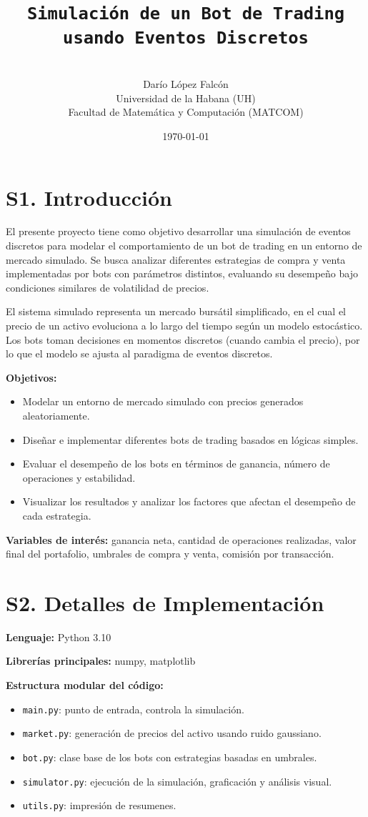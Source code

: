 \documentclass[a4paper,12pt]{article}
\title{\texttt{Simulación de un Bot de Trading \\usando Eventos Discretos}}
\author{\\Darío López Falcón \\ Universidad de la Habana (UH) \\ Facultad de Matemática 
y Computación (MATCOM)}
\date{\today}
\begin{document}
\maketitle

\section*{S1. Introducción}

El presente proyecto tiene como objetivo desarrollar una simulación de eventos 
discretos para modelar el comportamiento de un bot de trading en un entorno de 
mercado simulado. Se busca analizar diferentes estrategias de compra y venta 
implementadas por bots con parámetros distintos, evaluando su desempeño bajo 
condiciones similares de volatilidad de precios.

El sistema simulado representa un mercado bursátil simplificado, en el cual el 
precio de un activo evoluciona a lo largo del tiempo según un modelo estocástico. 
Los bots toman decisiones en momentos discretos (cuando cambia el precio), por 
lo que el modelo se ajusta al paradigma de eventos discretos.

\textbf{Objetivos:}
\begin{itemize}
\item Modelar un entorno de mercado simulado con precios generados aleatoriamente.
\item Diseñar e implementar diferentes bots de trading basados en lógicas simples.
\item Evaluar el desempeño de los bots en términos de ganancia, número de operaciones y estabilidad.
\item Visualizar los resultados y analizar los factores que afectan el desempeño de cada estrategia.
\end{itemize}

\textbf{Variables de interés:} ganancia neta, cantidad de operaciones realizadas, 
valor final del portafolio, umbrales de compra y venta, comisión por transacción.

\section*{S2. Detalles de Implementación}

\textbf{Lenguaje:} Python 3.10

\textbf{Librerías principales:} numpy, matplotlib

\textbf{Estructura modular del código:}
\begin{itemize}
\item \texttt{main.py}: punto de entrada, controla la simulación.
\item \texttt{market.py}: generación de precios del activo usando ruido gaussiano.
\item \texttt{bot.py}: clase base de los bots con estrategias basadas en umbrales.
\item \texttt{simulator.py}: ejecución de la simulación, graficación y análisis visual.
\item \texttt{utils.py}: impresión de resumenes.
\end{itemize}
\end{document}
